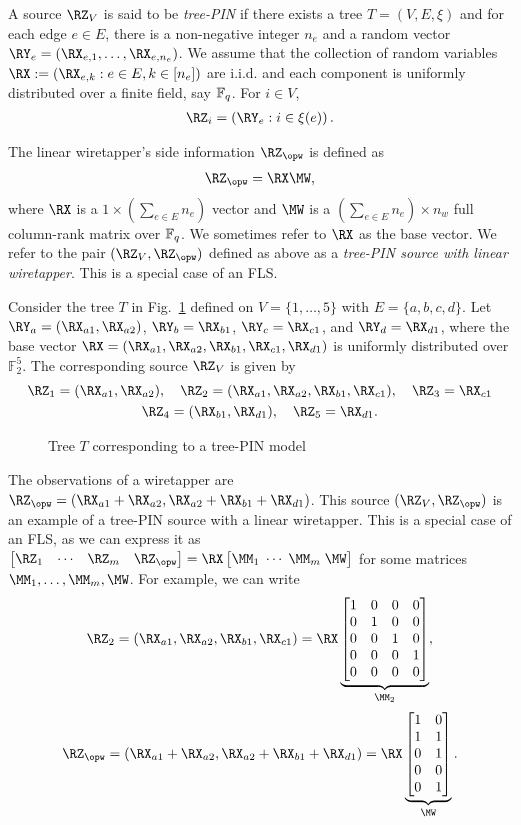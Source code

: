 A source $\RZ_V$ is said to be \emph{tree-PIN} if there exists a tree $T=(V,E,\xi)$ and for each edge $e \in E$, there is a non-negative integer $n_e$ and a random vector $\RY_e = \left( \RX_{e,1}, \ldots, \RX_{e,n_e} \right)$. We assume that the collection of random variables $\RX :=(\RX_{e,k}: e\in E, k \in [n_e])$ are i.i.d. and each component is  uniformly distributed over a finite field, say $\mathbb{F}_q$. For $i \in V$,
 \begin{align*}
  \RZ_i = \left( \RY_e : i \in \xi (e) \right).
 \end{align*} 

 The linear wiretapper's side information $\RZ_{\opw}$ is defined as 
\begin{align*}
 \RZ_{\opw} = \RX \MW,
\end{align*}
where $\RX$ is a $1 \times (\sum_{e \in E}n_e)$ vector and $\MW$ is a $(\sum_{e \in E}n_e) \times n_w$ full column-rank matrix over $\mathbb{F}_q$. We sometimes refer to $\RX$ as the base vector. We refer to the pair $(\RZ_V, \RZ_{\opw})$ defined as above as a \emph{tree-PIN source with linear wiretapper}. This is a special case of an FLS. 

\begin{example}
Consider the tree $T$ in Fig.~\ref{fig:tree_pin_def} defined on  $V=\{1, \ldots,5\}$ with $E=\{a,b,c,d\}$. Let $\RY_a = (\RX_{a1}, \RX_{a2})$, $\RY_b = \RX_{b1}$, $\RY_c =\RX_{c1}$, and $\RY_d =\RX_{d1}$, where the base vector $\RX= (\RX_{a1}, \RX_{a2}, \RX_{b1}, \RX_{c1}, \RX_{d1})$ is uniformly distributed over $\mathbb{F}_2^5$. The corresponding source $\RZ_V$ is given by
\begin{gather*}
   \RZ_1= (\RX_{a1}, \RX_{a2}), \quad \RZ_2= (\RX_{a1}, \RX_{a2}, \RX_{b1}, \RX_{c1}), \quad \RZ_3=\RX_{c1}\\
    \RZ_4= (\RX_{b1}, \RX_{d1}), \quad \RZ_5= \RX_{d1}.
\end{gather*}


\begin{figure}[h]
    \centering
        \resizebox{0.85\width}{!}{}
        \caption{Tree $T$ corresponding to a tree-PIN model}\label{fig:tree_pin_def}
\end{figure}
The observations of a wiretapper are $\RZ_{\opw}=(\RX_{a1}+\RX_{a2}, \RX_{a2}+\RX_{b1}+\RX_{d1})$.
This source $(\RZ_V, \RZ_{\opw})$ is an example of a tree-PIN source with a linear wiretapper. This is a special case of an FLS, as we can express it as $\bM \RZ_1 & \cdots& \RZ_m & \RZ_{\opw}\eM=\RX \bM \MM_1\;\cdots\;\MM_m \; \MW \eM$ for some matrices $\MM_1,\dots, \MM_m, \MW$. For example, we can write  $$\RZ_2= (\RX_{a1}, \RX_{a2}, \RX_{b1}, \RX_{c1})=\RX \underbrace{\bM 1&0&0&0\\0 & 1&0&0\\ 0 & 0&1&0\\0&0&0&1\\ 0 & 0&0&0 \eM}_{\MM_2},$$ 
$$\RZ_{\opw}=(\RX_{a1}+\RX_{a2}, \RX_{a2}+\RX_{b1}+\RX_{d1})=\RX \underbrace{\bM 1&0\\1 & 1\\ 0 & 1\\0&0\\ 0 & 1 \eM}_{\MW}.$$
\end{example}

